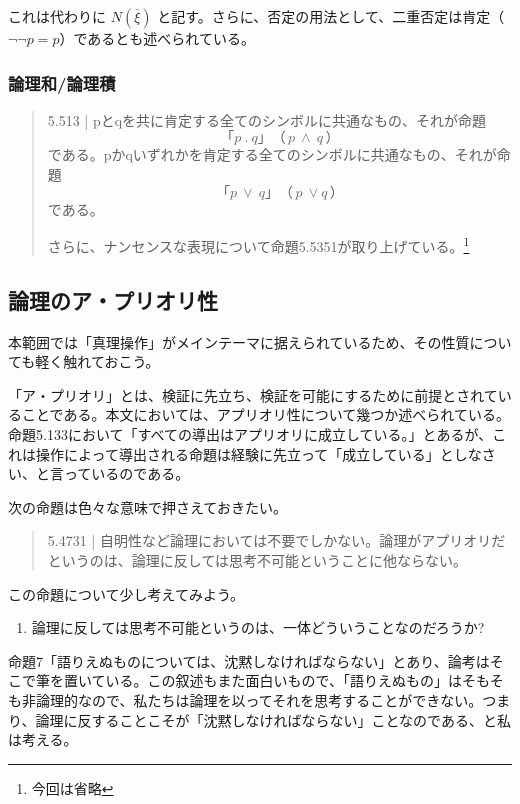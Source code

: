 \documentclass[11pt,a4paper,onecolumn,article]{jarticle}
\newcounter{ct}               %
\begin{document}
これは代わりに
$ N( \overline{ \xi } ) $
と記す。さらに、否定の用法として、二重否定は肯定（$\lnot \lnot p = p$）であるとも述べられている。
\subsubsection{論理和/論理積}
\begin{quote}
  5.513 | pとqを共に肯定する全てのシンボルに共通なもの、それが命題
  \[
    「 p \ . \ q  」（ \, p \ \land \ q\, ）
  \]
    である。pかqいずれかを肯定する全てのシンボルに共通なもの、それが命題
  \[
    「 p \ \vee \ q 」（\,p \ \lor q \,）
  \]
    である。

  さらに、ナンセンスな表現について命題5.5351が取り上げている。\footnote{今回は省略}
\end{quote}


\subsection{論理のア・プリオリ性}

本範囲では「真理操作」がメインテーマに据えられているため、その性質についても軽く触れておこう。

「ア・プリオリ」とは、検証に先立ち、検証を可能にするために前提とされていることである。本文においては、アプリオリ性について幾つか述べられている。命題5.133において「すべての導出はアプリオリに成立している。」とあるが、これは操作によって導出される命題は経験に先立って「成立している」としなさい、と言っているのである。

次の命題は色々な意味で押さえておきたい。
\begin{quote}

  5.4731 | 自明性など論理においては不要でしかない。論理がアプリオリだというのは、論理に反しては思考不可能ということに他ならない。

\end{quote}

この命題について少し考えてみよう。
\begin{enumerate}
  \item 論理に反しては思考不可能というのは、一体どういうことなのだろうか?
\end{enumerate}

命題7「語りえぬものについては、沈黙しなければならない」とあり、論考はそこで筆を置いている。この叙述もまた面白いもので、「語りえぬもの」はそもそも非論理的なので、私たちは論理を以ってそれを思考することができない。つまり、論理に反することこそが「沈黙しなければならない」ことなのである、と私は考える。
\end{document}

